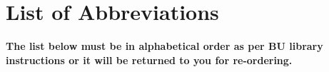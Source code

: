 \tableofcontents
\cleardoublepage


\newpage
\listoffigures
\cleardoublepage

\chapter*{List of Abbreviations}

{\bf The list below must be in alphabetical order as per BU library instructions or it will be returned to you for re-ordering.}

\cleardoublepage

\newpage
\endofprelim
